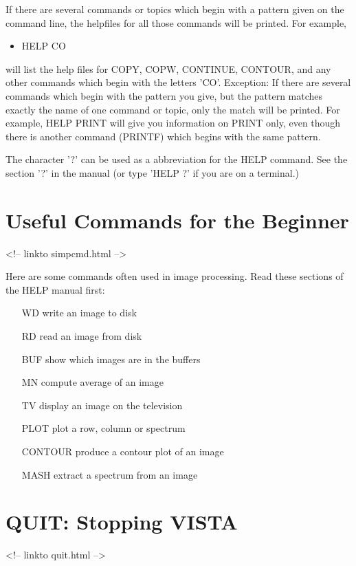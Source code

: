 If there are several commands or topics which begin with a pattern given on
the command line, the helpfiles for all those commands will be printed.
For example,
\begin{itemize}
   \item{HELP CO}
\end{itemize}
will list the help files for COPY, COPW, CONTINUE, CONTOUR, and any other
commands which begin with the letters 'CO'.  Exception: If there are
several commands which begin with the pattern you give, but the pattern
matches exactly the name of one command or topic, only the match will be
printed.  For example, HELP PRINT will give you information on PRINT only,
even though there is another command (PRINTF) which begins with the same
pattern.

The character '?' can be used as a abbreviation for the HELP command.  See
the section '?' in the manual (or type 'HELP ?' if you are on a terminal.)

\section{Useful Commands for the Beginner}
\begin{rawhtml}
<!-- linkto simpcmd.html -->
\end{rawhtml}


Here are some commands often used in image processing.  Read these sections
of the HELP manual first:

\begin{itemize}
   \item[WD\hfill]{write an image to disk}
   \item[RD\hfill]{read an image from disk}
   \item[BUF\hfill]{show which images are in the buffers}
   \item[MN\hfill]{compute average of an image}
   \item[TV\hfill]{display an image on the television}
   \item[PLOT\hfill]{plot a row, column or spectrum}
   \item[CONTOUR\hfill]{produce a contour plot of an image}
   \item[MASH\hfill]{extract a spectrum from an image}
\end{itemize}

\section{QUIT: Stopping VISTA}
\begin{rawhtml}
<!-- linkto quit.html -->
\end{rawhtml}

